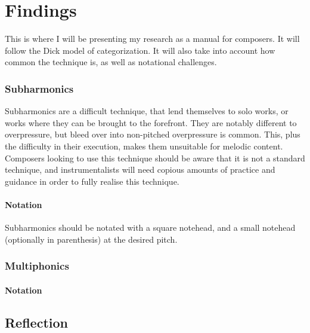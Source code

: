 
\chapter{Findings}
This is where I will be presenting my research as a manual for composers. 
It will follow the Dick model of categorization.\autocite{dickOtherFlute1989} 
It will also take into account how common the technique is, as well as notational challenges.

\subsection{Subharmonics}
Subharmonics are a difficult technique, that lend themselves to solo works, or works where they can be brought to the forefront.
They are notably different to overpressure, but bleed over into non-pitched overpressure is common.
This, plus the difficulty in their execution, makes them unsuitable for melodic content.
Composers looking to use this technique should be aware that it is not a standard technique, and instrumentalists will need copious amounts of practice and guidance in order to fully realise this technique.

\subsubsection{Notation}
Subharmonics should be notated with a square notehead, and a small notehead (optionally in parenthesis) at the desired pitch.

\subsection{Multiphonics}
\lipsum[4]

\subsubsection{Notation}
\lipsum[5]

\section{Reflection}




\lipsum[4]